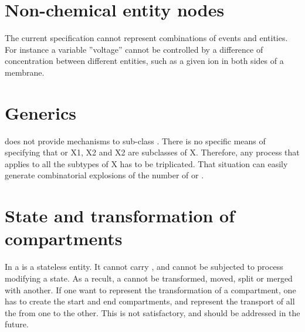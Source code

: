 \section{Non-chemical entity nodes}

The current specification cannot represent combinations of events and entities. For instance a variable ''voltage'' cannot be controlled by a difference of concentration between different entities, such as a given ion in both sides of a membrane. 

\section{Generics}

\SBGNPDLone does not provide mechanisms to sub-class . There is no specific means of specifying that  or  X1, X2 and X2 are subclasses of X. Therefore, any process that applies to all the subtypes of X has to be triplicated. That situation can easily generate combinatorial explosions of the number of  or .

\section{State and transformation of compartments}

In \SBGNPDLone a  is a stateless entity. It cannot carry  , and cannot be subjected to process modifying a state. As a recult, a  cannot be transformed, moved, split or merged with another. If one want to represent the transformation of a compartment, one has to create the start and end compartments, and represent the transport of all the  from one to the other. This is not satisfactory, and should be addressed in the future.